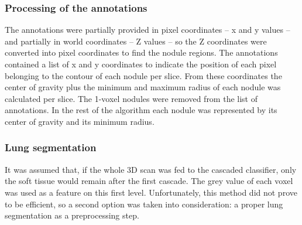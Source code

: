 \subsubsection{Processing of the annotations}

The annotations were partially provided in pixel coordinates -- x and y values
-- and partially in world coordinates -- Z values -- so the Z coordinates were
converted into pixel coordinates to find the nodule regions. The annotations
contained a list of x and y coordinates to indicate the position of each pixel
belonging to the contour of each nodule per slice. From these coordinates the
center of gravity plus the minimum and maximum radius of each nodule was
calculated per slice. The 1-voxel nodules were removed from the list of
annotations. In the rest of the algorithm each nodule was represented by its
center of gravity and its minimum radius.

\subsubsection{Lung segmentation}
It was assumed that, if the whole 3D scan was fed to the cascaded classifier,
only the soft tissue would remain after the first cascade. The grey value of
each voxel was used as a feature on this first level. Unfortunately, this method
did not prove to be efficient, so a second option was taken into consideration:
a proper lung segmentation as a preprocessing step.

